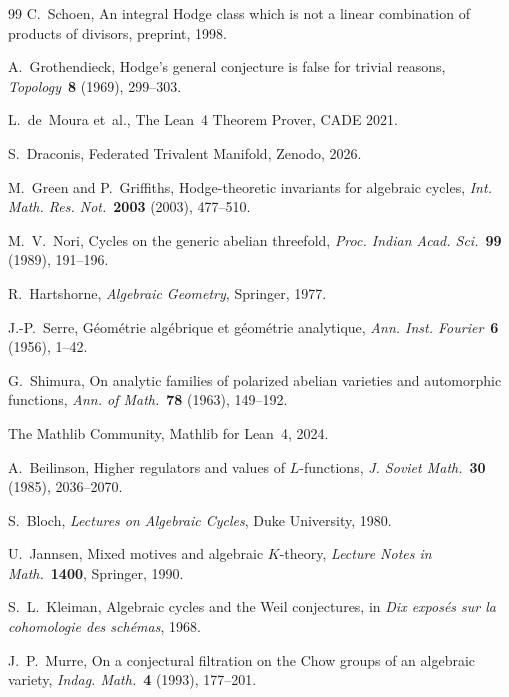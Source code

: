 \documentclass[12pt]{article}
\theoremstyle{plain}
\theoremstyle{definition}
\begin{document}
\begin{thebibliography}{99}
C.~Schoen,
An integral Hodge class which is not a linear combination of
products of divisors,
preprint, 1998.

A.~Grothendieck,
Hodge's general conjecture is false for trivial reasons,
\emph{Topology}\ \textbf{8} (1969), 299--303.

L.~de~Moura et~al., The Lean~4 Theorem Prover, CADE 2021.

S.~Draconis, Federated Trivalent Manifold, Zenodo, 2026.

M.~Green and P.~Griffiths,
Hodge-theoretic invariants for algebraic cycles,
\emph{Int. Math. Res. Not.}\ \textbf{2003} (2003), 477--510.

M.~V.~Nori,
Cycles on the generic abelian threefold,
\emph{Proc. Indian Acad. Sci.}\ \textbf{99} (1989), 191--196.

R.~Hartshorne,
\emph{Algebraic Geometry},
Springer, 1977.

J.-P.~Serre,
G\'eom\'etrie alg\'ebrique et g\'eom\'etrie analytique,
\emph{Ann. Inst. Fourier}\ \textbf{6} (1956), 1--42.

G.~Shimura,
On analytic families of polarized abelian varieties and automorphic
functions,
\emph{Ann. of Math.}\ \textbf{78} (1963), 149--192.

The Mathlib Community, Mathlib for Lean~4, 2024.

A.~Beilinson,
Higher regulators and values of $L$-functions,
\emph{J. Soviet Math.}\ \textbf{30} (1985), 2036--2070.

S.~Bloch,
\emph{Lectures on Algebraic Cycles},
Duke University, 1980.

U.~Jannsen,
Mixed motives and algebraic $K$-theory,
\emph{Lecture Notes in Math.}\ \textbf{1400}, Springer, 1990.

S.~L.~Kleiman,
Algebraic cycles and the Weil conjectures,
in \emph{Dix expos\'es sur la cohomologie des sch\'emas}, 1968.

J.~P.~Murre,
On a conjectural filtration on the Chow groups of an algebraic variety,
\emph{Indag. Math.}\ \textbf{4} (1993), 177--201.

\end{thebibliography}
\end{document}
